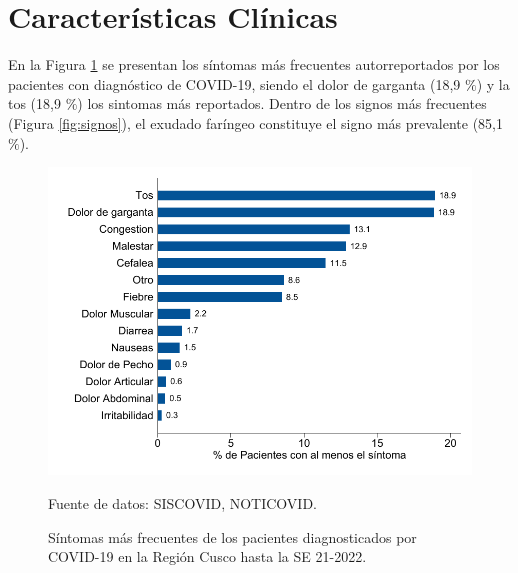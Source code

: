 \documentclass[12pt,a4paper,openany]{book}
\begin{document}
	
	
	\cleardoublepage
	
	
	\clearpage
	
	\section*{Características Clínicas}
	\noindent En la Figura \ref{fig:sintomas} se presentan los síntomas más frecuentes autorreportados por los pacientes con diagnóstico de COVID-19, siendo el dolor de garganta (18,9 $\%$) y la tos (18,9 $\%$) los sintomas más reportados. Dentro de los signos más frecuentes (Figura \ref{fig:signos}), el exudado faríngeo constituye el signo más prevalente (85,1 $\%$). 
	
	\begin{figure}[h]
		\caption{Síntomas más frecuentes de los pacientes diagnosticados por COVID-19 en la Región Cusco hasta la SE 21-2022.  }\label{fig:sintomas}
		\begin{center}
			\includegraphics[width=0.85\linewidth]{../figuras/figura_sintoma.pdf}
		\end{center}
		{\footnotesize {Fuente de datos: SISCOVID, NOTICOVID.}}
	\end{figure}
	
\end{document}
